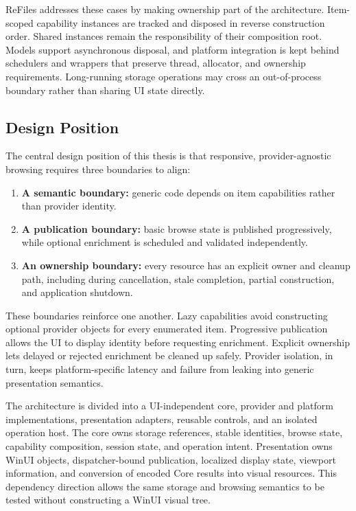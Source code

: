 \documentclass[10pt,a4paper,twoside]{article}
\begin{document}
ReFiles addresses these cases by making ownership part of the architecture. Item-scoped capability instances are
tracked and disposed in reverse construction order. Shared instances remain the responsibility of their
composition root. Models support asynchronous disposal, and platform integration is kept behind schedulers and
wrappers that preserve thread, allocator, and ownership requirements. Long-running storage operations may cross
an out-of-process boundary rather than sharing UI state directly.

\subsection{Design Position}

The central design position of this thesis is that responsive, provider-agnostic browsing requires three
boundaries to align:

\begin{enumerate}[leftmargin=*,label=\arabic*.]
  \item \textbf{A semantic boundary:} generic code depends on item capabilities rather than provider identity.
  \item \textbf{A publication boundary:} basic browse state is published progressively, while optional enrichment
        is scheduled and validated independently.
  \item \textbf{An ownership boundary:} every resource has an explicit owner and cleanup path, including during
        cancellation, stale completion, partial construction, and application shutdown.
\end{enumerate}

These boundaries reinforce one another. Lazy capabilities avoid constructing optional provider objects for every
enumerated item. Progressive publication allows the UI to display identity before requesting enrichment.
Explicit ownership lets delayed or rejected enrichment be cleaned up safely. Provider isolation, in turn, keeps
platform-specific latency and failure from leaking into generic presentation semantics.

The architecture is divided into a UI-independent core, provider and platform implementations, presentation
adapters, reusable controls, and an isolated operation host. The core owns storage references, stable identities,
browse state, capability composition, session state, and operation intent. Presentation owns WinUI objects,
dispatcher-bound publication, localized display state, viewport information, and conversion of encoded Core
results into visual resources. This dependency direction allows the same storage and browsing semantics to be
tested without constructing a WinUI visual tree.
\end{document}
